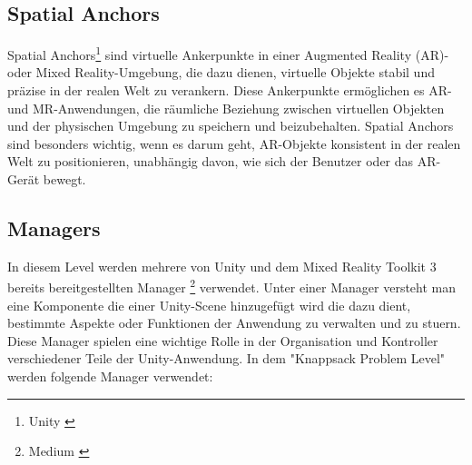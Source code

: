 \subsection{Spatial Anchors}
Spatial Anchors\footnote{Unity \cite{Anchor}} sind virtuelle Ankerpunkte in einer Augmented Reality (AR)- oder Mixed Reality-Umgebung, die dazu dienen,
virtuelle Objekte stabil und präzise in der realen Welt zu verankern. Diese Ankerpunkte ermöglichen es AR- und
MR-Anwendungen, die räumliche Beziehung zwischen virtuellen Objekten und der physischen Umgebung zu speichern und
beizubehalten. Spatial Anchors sind besonders wichtig, wenn es darum geht, AR-Objekte konsistent in der realen Welt
zu positionieren, unabhängig davon, wie sich der Benutzer oder das AR-Gerät bewegt.

\subsection{Managers}
In diesem Level werden mehrere von Unity und dem Mixed Reality Toolkit 3 bereits
bereitgestellten Manager \footnote{Medium \cite{Managers}} verwendet. Unter einer Manager
versteht man eine Komponente die einer Unity-Scene hinzugefügt wird die dazu dient,
bestimmte Aspekte oder Funktionen der Anwendung zu verwalten und zu stuern. Diese Manager
spielen eine wichtige Rolle in der Organisation und Kontroller verschiedener Teile der Unity-Anwendung.
In dem "Knappsack Problem Level" werden folgende Manager verwendet:
